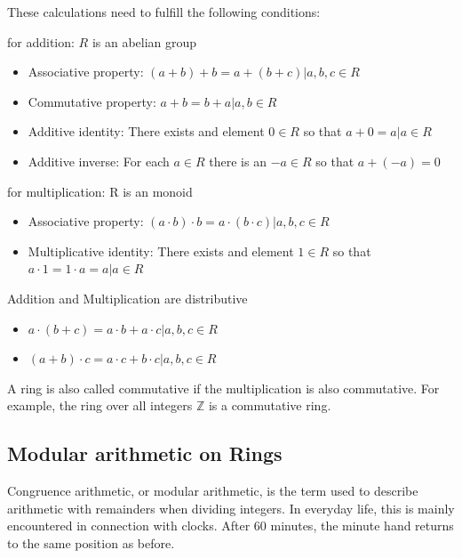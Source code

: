 These calculations need to fulfill the following conditions:
\begin{description}
  \item for addition: $R$ is an abelian group
        \begin{itemize}
          \item Associative property: $(a+b)+b = a+(b+c) | a,b,c \in R$
          \item Commutative property: $a+b = b+a | a,b \in R$
          \item Additive identity: There exists and element $0 \in R$ so that $a+0 = a | a \in R$
          \item Additive inverse: For each $a \in R$ there is an $-a \in R$ so that $a+(-a)=0$
        \end{itemize}
  \item for multiplication: R is an monoid
        \begin{itemize}
          \item Associative property: $(a\cdot b) \cdot b = a \cdot(b\cdot c) | a,b,c \in R$
          \item Multiplicative identity: There exists and element $1 \in R$ so that $a \cdot 1 = 1 \cdot a = a | a \in R$
        \end{itemize}
  \item Addition and Multiplication are distributive
        \begin{itemize}
          \item  $a\cdot (b + c) = a\cdot b + a\cdot c | a,b,c \in R$
          \item  $(a + b) \cdot c= a\cdot c + b\cdot c | a,b,c \in R$
        \end{itemize}
\end{description}

A ring is also called commutative if the multiplication is also commutative. For example, the ring over all integers $\mathbb{Z}$ is a commutative ring.

\subsection*{Modular arithmetic on Rings}

Congruence arithmetic, or modular arithmetic, is the term used to describe arithmetic with remainders when dividing integers. In everyday life, this is mainly encountered in connection with clocks. After 60 minutes, the minute hand returns to the same position as before. 

